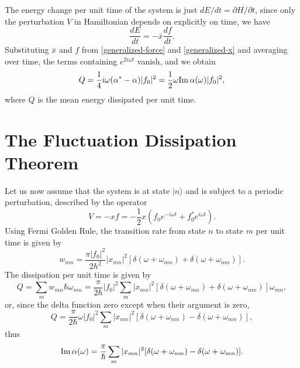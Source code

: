 \documentclass{book}
\newcommand{\ket}[1]{{|#1\rangle}}
\renewcommand{\Im}{{\rm Im}}
\numberwithin{equation}{section}
\begin{document}
The energy change per unit time of the system is just
$dE/dt=\overline{\partial H/\partial t}$, since only the perturbation
$V$ in Hamiltonian depends on explicitly on time, we have
\begin{equation}
  \frac{dE}{dt}=-\bar{x}\frac{df}{dt}.
\end{equation}
Substituting $\bar{x}$ and $f$ from \eqref{generalized-force} and
\eqref{generalized-x} and averaging over time, the terms containing 
$e^{2i\omega t}$ vanish, and we obtain 
\begin{equation}
  Q=\frac{1}{4}i\omega(\alpha^*-\alpha)|f_0|^2=
  \frac{1}{2}\omega\Im\,\alpha(\omega)|f_0|^2,
\end{equation}
where $Q$ is the mean energy dissipated per unit time.

\section{The Fluctuation Dissipation Theorem}
Let us now assume that the system is at state $\ket{n}$ and is subject to a
periodic perturbation, described by the operator
\begin{equation}
  V=-xf=-\frac{1}{2}x(f_0e^{-i\omega t}+f_0^*e^{i\omega t}).
\end{equation}
Using Fermi Golden Rule, the transition rate from state $n$ to state
$m$ per unit time is given by
\begin{equation}
  w_{mn}=\frac{\pi|f_0|^2}{2\hbar^2}|x_{mn}|^2
  [\delta(\omega+\omega_{mn})+\delta(\omega+\omega_{nm})].
\end{equation}
The dissipation per unit time is given by
\begin{equation}
  Q=\sum_{m}w_{mn}\hbar\omega_{mn}=\frac{\pi}{2\hbar}|f_0|^2
  \sum_m|x_{mn}|^2[\delta(\omega+\omega_{mn})+\delta(\omega+\omega_{nm})]
  \omega_{mn},
\end{equation}
or, since the delta function zero except when their argument is zero,
\begin{equation}
  Q=\frac{\pi}{2\hbar}\omega|f_0|^2
  \sum_m|x_{mn}|^2[\delta(\omega+\omega_{nm})-\delta(\omega+\omega_{mn})],
\end{equation}
thus
\begin{equation}
  \Im\,\alpha(\omega)=\frac{\pi}{\hbar}\sum_m|x_{mn}|^2
  [\delta(\omega+\omega_{nm})-\delta(\omega+\omega_{mn})].
\end{equation}
\end{document}
